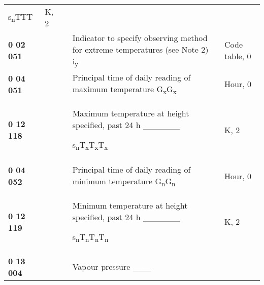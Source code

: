 \begin{longtable}[]{@{}lllll@{}}
\begin{minipage}[t]{0.17\columnwidth}
s\textsubscript{n}TTT\strut
\end{minipage} & \begin{minipage}[t]{0.17\columnwidth}\raggedright
K, 2\strut
\end{minipage}\tabularnewline
\textbf{0 02 051} & & & Indicator to specify observing method for extreme temperatures (see Note 2) i\textsubscript{y} & Code table, 0\tabularnewline
\textbf{0 04 051} & & & Principal time of daily reading of maximum temperature G\textsubscript{x}G\textsubscript{x} & Hour, 0\tabularnewline
\begin{minipage}[t]{0.17\columnwidth}\raggedright
\textbf{0 12 118}\strut
\end{minipage} & \begin{minipage}[t]{0.17\columnwidth}\raggedright
\strut
\end{minipage} & \begin{minipage}[t]{0.17\columnwidth}\raggedright
\strut
\end{minipage} & \begin{minipage}[t]{0.17\columnwidth}\raggedright
Maximum temperature at height specified, past 24 h \_\_\_\_\_\_

s\textsubscript{n}T\textsubscript{x}T\textsubscript{x}T\textsubscript{x}\strut
\end{minipage} & \begin{minipage}[t]{0.17\columnwidth}\raggedright
K, 2\strut
\end{minipage}\tabularnewline
\textbf{0 04 052} & & & Principal time of daily reading of minimum temperature G\textsubscript{n}G\textsubscript{n} & Hour, 0\tabularnewline
\begin{minipage}[t]{0.17\columnwidth}\raggedright
\textbf{0 12 119}\strut
\end{minipage} & \begin{minipage}[t]{0.17\columnwidth}\raggedright
\strut
\end{minipage} & \begin{minipage}[t]{0.17\columnwidth}\raggedright
\strut
\end{minipage} & \begin{minipage}[t]{0.17\columnwidth}\raggedright
Minimum temperature at height specified, past 24 h \_\_\_\_\_\_

s\textsubscript{n}T\textsubscript{n}T\textsubscript{n}T\textsubscript{n}\strut
\end{minipage} & \begin{minipage}[t]{0.17\columnwidth}\raggedright
K, 2\strut
\end{minipage}\tabularnewline
\begin{minipage}[t]{0.17\columnwidth}\raggedright
\textbf{0 13 004}\strut
\end{minipage} & \begin{minipage}[t]{0.17\columnwidth}\raggedright
\strut
\end{minipage} & \begin{minipage}[t]{0.17\columnwidth}\raggedright
\strut
\end{minipage} & \begin{minipage}[t]{0.17\columnwidth}\raggedright
Vapour pressure \_\_\_


\end{minipage}
\end{longtable}
